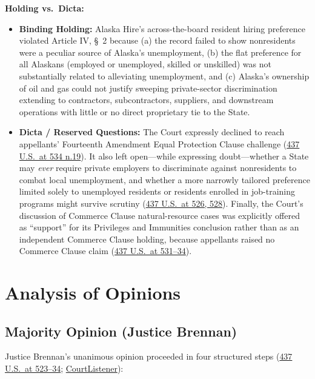 \documentclass[12pt]{article}
\begin{document}
\textbf{Holding vs.\ Dicta:}
\begin{itemize}
    \item \textbf{Binding Holding:} Alaska Hire's across-the-board resident hiring preference violated Article IV, \S\ 2 because (a) the record failed to show nonresidents were a peculiar source of Alaska's unemployment, (b) the flat preference for all Alaskans (employed or unemployed, skilled or unskilled) was not substantially related to alleviating unemployment, and (c) Alaska's ownership of oil and gas could not justify sweeping private-sector discrimination extending to contractors, subcontractors, suppliers, and downstream operations with little or no direct proprietary tie to the State.
    \item \textbf{Dicta / Reserved Questions:} The Court expressly declined to reach appellants' Fourteenth Amendment Equal Protection Clause challenge (\href{https://supreme.justia.com/cases/federal/us/437/518/}{437 U.S.\ at 534 n.19}). It also left open---while expressing doubt---whether a State may \textit{ever} require private employers to discriminate against nonresidents to combat local unemployment, and whether a more narrowly tailored preference limited solely to unemployed residents or residents enrolled in job-training programs might survive scrutiny (\href{https://supreme.justia.com/cases/federal/us/437/518/}{437 U.S.\ at 526, 528}). Finally, the Court's discussion of Commerce Clause natural-resource cases was explicitly offered as ``support'' for its Privileges and Immunities conclusion rather than as an independent Commerce Clause holding, because appellants raised no Commerce Clause claim (\href{https://supreme.justia.com/cases/federal/us/437/518/}{437 U.S.\ at 531--34}).
\end{itemize}

\section{Analysis of Opinions}

\subsection{Majority Opinion (Justice Brennan)}

Justice Brennan's unanimous opinion proceeded in four structured steps (\href{https://supreme.justia.com/cases/federal/us/437/518/}{437 U.S.\ at 523--34}; \href{https://www.courtlistener.com/opinion/109911/hicklin-v-orbeck/}{CourtListener}):
\end{document}

